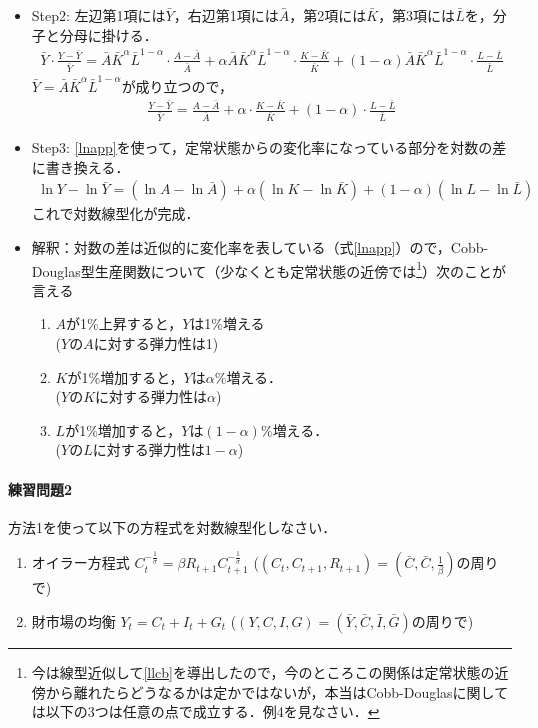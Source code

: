 \documentclass[a4paper,12pt,onecolumn,oneside,notitlepage,final]{article}
\begin{document}
\begin{itemize}
\item Step2: 左辺第1項には$\bar Y$，右辺第1項には$\bar A$，第2項には$\bar K$，第3項には$\bar L$を，分子と分母に掛ける．
\begin{align*}
\bar Y \cdot \frac{Y-\bar Y}{\bar Y} = \bar A \bar K^\alpha \bar L^{1-\alpha} \cdot \frac{A-\bar A}{\bar A} + \alpha \bar A \bar K^\alpha \bar L^{1-\alpha} \cdot \frac{K-\bar K}{\bar K} + (1-\alpha) \bar A \bar K^\alpha \bar L^{1-\alpha} \cdot \frac{L-\bar L}{\bar L}
\end{align*}
$\bar Y = \bar A \bar K^\alpha \bar L^{1-\alpha}$が成り立つので，
\begin{align*}
\frac{Y-\bar Y}{\bar Y} = \frac{A-\bar A}{\bar A} + \alpha \cdot \frac{K-\bar K}{\bar K} + (1-\alpha) \cdot \frac{L-\bar L}{\bar L}
\end{align*}
\item Step3: \eqref{lnapp}を使って，定常状態からの変化率になっている部分を対数の差に書き換える．
\begin{align}
\ln Y - \ln \bar Y = (\ln A - \ln \bar A) + \alpha (\ln K - \ln \bar K) + (1-\alpha) (\ln L - \ln \bar L) \label{llcb}
\end{align}
これで対数線型化が完成．
\item 解釈：対数の差は近似的に変化率を表している（式\eqref{lnapp}）ので，Cobb-Douglas型生産関数について（少なくとも定常状態の近傍では\footnote{今は線型近似して\eqref{llcb}を導出したので，今のところこの関係は定常状態の近傍から離れたらどうなるかは定かではないが，本当はCobb-Douglasに関しては以下の3つは任意の点で成立する．例4を見なさい．}）次のことが言える
\begin{enumerate}
\item $A$が1\%上昇すると，$Y$は1\%増える\\
 ($Y$の$A$に対する弾力性は1)
\item $K$が1\%増加すると，$Y$は$\alpha\%$増える．\\
($Y$の$K$に対する弾力性は$\alpha$)
\item $L$が1\%増加すると，$Y$は$(1-\alpha)\%$増える．\\
($Y$の$L$に対する弾力性は$1-\alpha$)
\end{enumerate}
\end{itemize}

\paragraph{練習問題2} 方法1を使って以下の方程式を対数線型化しなさい．
\begin{enumerate}
\item オイラー方程式 $C_t^{-\frac{1}{\sigma}} = \beta R_{t+1} C_{t+1}^{-\frac{1}{\sigma}}$ ($(C_t, C_{t+1}, R_{t+1}) = (\bar C, \bar C, \frac{1}{\beta})$の周りで)
\item 財市場の均衡 $Y_t = C_t + I_t + G_t$ ($(Y,C,I,G) = (\bar Y, \bar C, \bar I, \bar G)$の周りで)
\end{enumerate}
\end{document}
